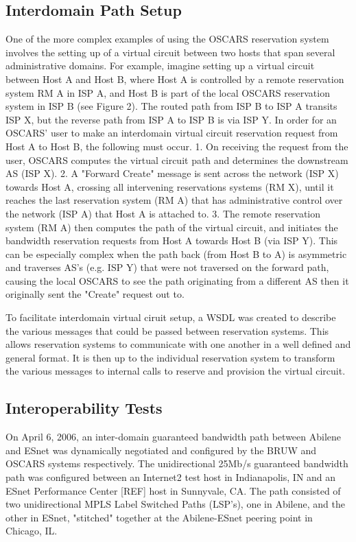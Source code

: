 \documentclass[conference]{IEEEtran}
\begin{document}
\subsection{Interdomain Path Setup }
One of the more complex examples of using the OSCARS reservation system
involves the setting up of a virtual circuit between two hosts that span
several administrative domains.  For example, imagine setting up a
virtual circuit between Host A and Host B, where Host A is controlled by a
remote reservation system RM A in ISP A, and Host B is part of the local
OSCARS reservation system in ISP B (see Figure 2). The routed path from ISP B
to ISP A transits ISP X, but the reverse path from ISP A to ISP B is via ISP Y.
In order for an OSCARS' user to make an interdomain virtual circuit reservation
request from Host A to Host B, the following must occur.
1. On receiving the request from the user, OSCARS
computes the virtual circuit path and determines the downstream AS (ISP X).
2. A "Forward Create" message is sent across the network (ISP X) towards Host
A, crossing all intervening reservations systems (RM X), until it reaches the
last reservation system (RM A) that has administrative control over the network
(ISP A) that Host A is attached to.
3. The remote reservation system (RM A) then computes the path of the virtual
circuit, and initiates the bandwidth reservation requests from Host A towards
Host B (via ISP Y).  This can be especially complex when the path back (from
Host B to A) is asymmetric and traverses AS's (e.g. ISP Y) that were not
traversed on the forward path, causing the local OSCARS to see the path
originating from a different AS then it originally sent the "Create" request
out to.

To facilitate interdomain virtual ciruit setup, a WSDL was created to describe
the various messages that could be passed between reservation systems. This
allows reservation systems to communicate with one another in a well defined
and general format. It is then up to the individual reservation system to 
transform the various messages to internal calls to reserve and provision the 
virtual circuit.

\subsection{Interoperability Tests}

On April 6, 2006, an inter-domain guaranteed bandwidth path between Abilene and 
ESnet was dynamically negotiated and configured by the BRUW and OSCARS systems 
respectively. The unidirectional 25Mb/s guaranteed bandwidth path was 
configured between an Internet2 test host in Indianapolis, IN and an ESnet 
Performance Center [REF] host in Sunnyvale, CA.  The path consisted of two 
unidirectional MPLS Label Switched Paths (LSP's), one in Abilene, and the 
other in ESnet, "stitched" together at the Abilene-ESnet peering point in 
Chicago, IL.
\end{document}
